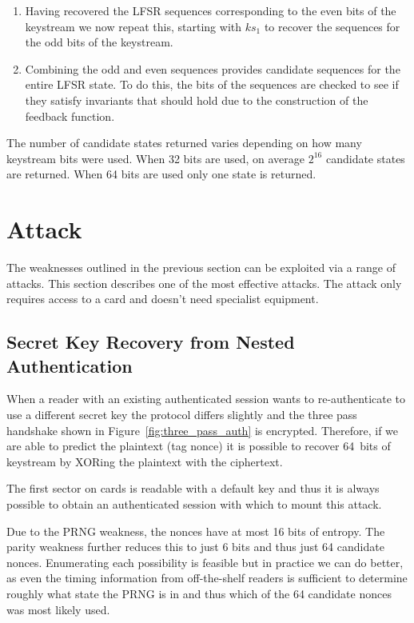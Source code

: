 \documentclass[dissertation.tex]{subfiles}
\begin{document}
\begin{enumerate}
    \item Having recovered the LFSR sequences corresponding to the even bits of the keystream we now repeat this, starting with $ks_1$ to recover the sequences for the odd bits of the keystream.

    \item Combining the odd and even sequences provides candidate sequences for the entire LFSR state. To do this, the bits of the sequences are checked to see if they satisfy invariants that should hold due to the construction of the feedback function.
  \end{enumerate}

  The number of candidate states returned varies depending on how many keystream bits were used. When 32 bits are used, on average $2^{16}$ candidate states are returned. When 64 bits are used only one state is returned.


  \section{Attack}
  The weaknesses outlined in the previous section can be exploited via a range of attacks. This section describes one of the most effective attacks. The attack only requires access to a card and doesn't need specialist equipment.


  \subsection{Secret Key Recovery from Nested Authentication}

  When a reader with an existing authenticated session wants to re-authenticate to use a different secret key the protocol differs slightly and the three pass handshake shown in Figure~\vref{fig:three_pass_auth} is encrypted. Therefore, if we are able to predict the plaintext (tag nonce) it is possible to recover \SI{64}{bits} of keystream by XORing the plaintext with the ciphertext.

  The first sector on \mifare{} cards is readable with a default key and thus it is always possible to obtain an authenticated session with which to mount this attack.

  Due to the PRNG weakness, the nonces have at most 16 bits of entropy. The parity weakness further reduces this to just 6 bits and thus just 64 candidate nonces. Enumerating each possibility is feasible but in practice we can do better, as even the timing information from off-the-shelf readers is sufficient to determine roughly what state the PRNG is in and thus which of the 64 candidate nonces was most likely used.
\end{document}
